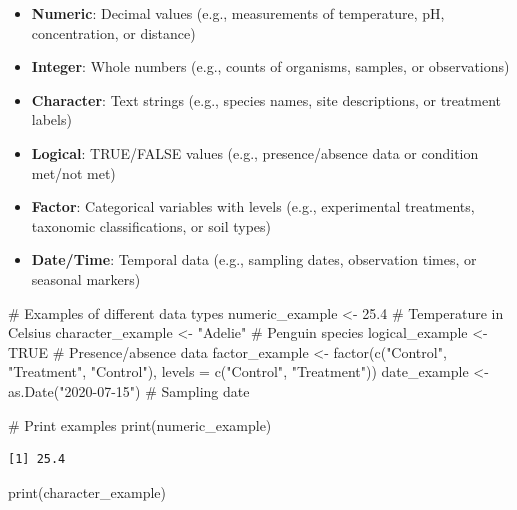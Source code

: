 \documentclass[
  letterpaper,
]{book}
\newenvironment{Shaded}{\begin{snugshade}}{\end{snugshade}}
\newcommand{\AttributeTok}[1]{\textcolor[rgb]{0.40,0.45,0.13}{#1}}
\newcommand{\CommentTok}[1]{\textcolor[rgb]{0.37,0.37,0.37}{#1}}
\newcommand{\ConstantTok}[1]{\textcolor[rgb]{0.56,0.35,0.01}{#1}}
\newcommand{\FloatTok}[1]{\textcolor[rgb]{0.68,0.00,0.00}{#1}}
\newcommand{\FunctionTok}[1]{\textcolor[rgb]{0.28,0.35,0.67}{#1}}
\newcommand{\NormalTok}[1]{\textcolor[rgb]{0.00,0.23,0.31}{#1}}
\newcommand{\OtherTok}[1]{\textcolor[rgb]{0.00,0.23,0.31}{#1}}
\newcommand{\StringTok}[1]{\textcolor[rgb]{0.13,0.47,0.30}{#1}}
\providecommand{\tightlist}{%
  \setlength{\itemsep}{0pt}\setlength{\parskip}{0pt}}
\begin{document}
\begin{itemize}
\tightlist
\item
  \textbf{Numeric}: Decimal values (e.g., measurements of temperature,
  pH, concentration, or distance)
\item
  \textbf{Integer}: Whole numbers (e.g., counts of organisms, samples,
  or observations)
\item
  \textbf{Character}: Text strings (e.g., species names, site
  descriptions, or treatment labels)
\item
  \textbf{Logical}: TRUE/FALSE values (e.g., presence/absence data or
  condition met/not met)
\item
  \textbf{Factor}: Categorical variables with levels (e.g., experimental
  treatments, taxonomic classifications, or soil types)
\item
  \textbf{Date/Time}: Temporal data (e.g., sampling dates, observation
  times, or seasonal markers)
\end{itemize}

\begin{Shaded}
\begin{Highlighting}[]
\CommentTok{\# Examples of different data types}
\NormalTok{numeric\_example }\OtherTok{\textless{}{-}} \FloatTok{25.4}  \CommentTok{\# Temperature in Celsius}
\NormalTok{character\_example }\OtherTok{\textless{}{-}} \StringTok{"Adelie"}  \CommentTok{\# Penguin species}
\NormalTok{logical\_example }\OtherTok{\textless{}{-}} \ConstantTok{TRUE}  \CommentTok{\# Presence/absence data}
\NormalTok{factor\_example }\OtherTok{\textless{}{-}} \FunctionTok{factor}\NormalTok{(}\FunctionTok{c}\NormalTok{(}\StringTok{"Control"}\NormalTok{, }\StringTok{"Treatment"}\NormalTok{, }\StringTok{"Control"}\NormalTok{), }
                         \AttributeTok{levels =} \FunctionTok{c}\NormalTok{(}\StringTok{"Control"}\NormalTok{, }\StringTok{"Treatment"}\NormalTok{))}
\NormalTok{date\_example }\OtherTok{\textless{}{-}} \FunctionTok{as.Date}\NormalTok{(}\StringTok{"2020{-}07{-}15"}\NormalTok{)  }\CommentTok{\# Sampling date}

\CommentTok{\# Print examples}
\FunctionTok{print}\NormalTok{(numeric\_example)}
\end{Highlighting}
\end{Shaded}

\begin{verbatim}
[1] 25.4
\end{verbatim}

\begin{Shaded}
\begin{Highlighting}[]
\FunctionTok{print}\NormalTok{(character\_example)}
\end{Highlighting}
\end{Shaded}
\end{document}
